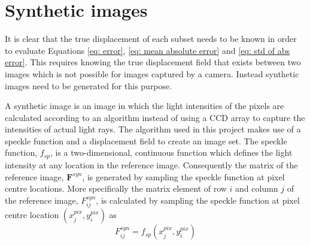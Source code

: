 \documentclass[12pt,oneside,openany,a4paper, %
english, %
masters-t, goldenblock]{usthesis}
\begin{document}




\section{Synthetic images}
\label{sec: synthetic image}
It is clear that the true displacement of each subset needs to be known in order to evaluate Equations \ref{eq: error}, \ref{eq: mean absolute error} and \ref{eq: std of abs error}. This requires knowing the true displacement field that exists between two images which is not possible for images captured by a camera. Instead synthetic images need to be generated for this purpose. 

A synthetic image is an image in which the light intensities of the pixels are calculated according to an algorithm instead of using a CCD array to capture the intensities of actual light rays. The algorithm used in this project makes use of a speckle function and a displacement field to create an image set. The speckle function, $f_{sp}$, is a two-dimensional, continuous function which defines the light intensity at any location in the reference image. Consequently the matrix of the reference image, $\bm{F}^{syn}$, is generated by sampling the speckle function at pixel centre locations. More specifically the matrix element of row $i$ and column $j$ of the reference image, $F_{ij}^{syn}$, is calculated by sampling the speckle function at pixel centre location $(x_j^{pix},y_i^{pix})$ as
\begin{equation}
  F_{ij}^{syn}=f_{sp} \left( x_j^{pix},y_i^{pix} \right)
\end{equation}
\end{document}
